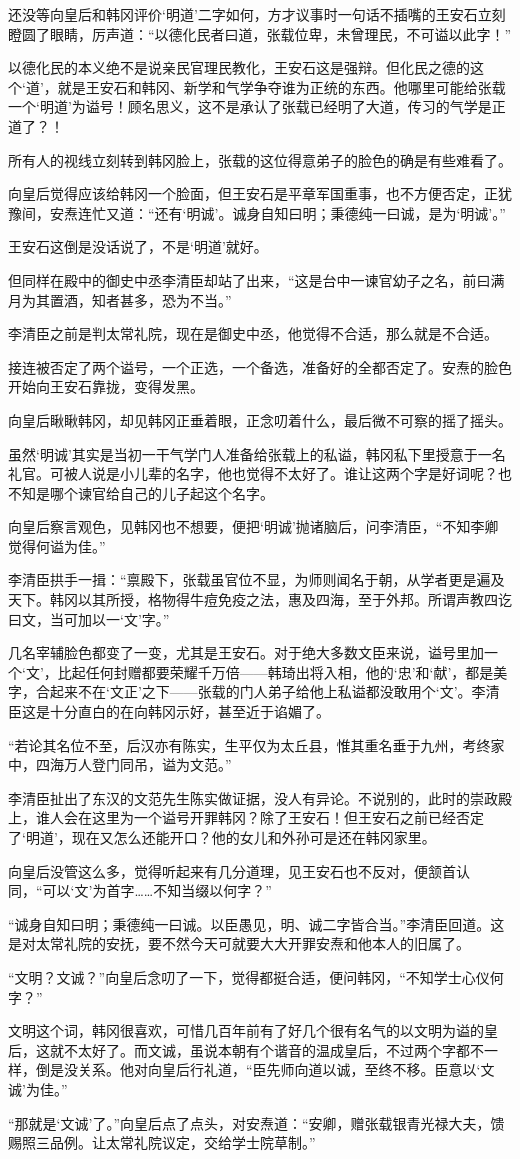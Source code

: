 还没等向皇后和韩冈评价‘明道’二字如何，方才议事时一句话不插嘴的王安石立刻瞪圆了眼睛，厉声道：“以德化民者曰道，张载位卑，未曾理民，不可谥以此字！”

以德化民的本义绝不是说亲民官理民教化，王安石这是强辩。但化民之德的这个‘道’，就是王安石和韩冈、新学和气学争夺谁为正统的东西。他哪里可能给张载一个‘明道’为谥号！顾名思义，这不是承认了张载已经明了大道，传习的气学是正道了？！

所有人的视线立刻转到韩冈脸上，张载的这位得意弟子的脸色的确是有些难看了。

向皇后觉得应该给韩冈一个脸面，但王安石是平章军国重事，也不方便否定，正犹豫间，安焘连忙又道：“还有‘明诚’。诚身自知曰明；秉德纯一曰诚，是为‘明诚’。”

王安石这倒是没话说了，不是‘明道’就好。

但同样在殿中的御史中丞李清臣却站了出来，“这是台中一谏官幼子之名，前曰满月为其置酒，知者甚多，恐为不当。”

李清臣之前是判太常礼院，现在是御史中丞，他觉得不合适，那么就是不合适。

接连被否定了两个谥号，一个正选，一个备选，准备好的全都否定了。安焘的脸色开始向王安石靠拢，变得发黑。

向皇后瞅瞅韩冈，却见韩冈正垂着眼，正念叨着什么，最后微不可察的摇了摇头。

虽然‘明诚’其实是当初一干气学门人准备给张载上的私谥，韩冈私下里授意于一名礼官。可被人说是小儿辈的名字，他也觉得不太好了。谁让这两个字是好词呢？也不知是哪个谏官给自己的儿子起这个名字。

向皇后察言观色，见韩冈也不想要，便把‘明诚’抛诸脑后，问李清臣，“不知李卿觉得何谥为佳。”

李清臣拱手一揖：“禀殿下，张载虽官位不显，为师则闻名于朝，从学者更是遍及天下。韩冈以其所授，格物得牛痘免疫之法，惠及四海，至于外邦。所谓声教四讫曰文，当可加以一‘文’字。”

几名宰辅脸色都变了一变，尤其是王安石。对于绝大多数文臣来说，谥号里加一个‘文’，比起任何封赠都要荣耀千万倍——韩琦出将入相，他的‘忠’和‘献’，都是美字，合起来不在‘文正’之下——张载的门人弟子给他上私谥都没敢用个‘文’。李清臣这是十分直白的在向韩冈示好，甚至近于谄媚了。

“若论其名位不至，后汉亦有陈实，生平仅为太丘县，惟其重名垂于九州，考终家中，四海万人登门同吊，谥为文范。”

李清臣扯出了东汉的文范先生陈实做证据，没人有异论。不说别的，此时的崇政殿上，谁人会在这里为一个谥号开罪韩冈？除了王安石！但王安石之前已经否定了‘明道’，现在又怎么还能开口？他的女儿和外孙可是还在韩冈家里。

向皇后没管这么多，觉得听起来有几分道理，见王安石也不反对，便颔首认同，“可以‘文’为首字……不知当缀以何字？”

“诚身自知曰明；秉德纯一曰诚。以臣愚见，明、诚二字皆合当。”李清臣回道。这是对太常礼院的安抚，要不然今天可就要大大开罪安焘和他本人的旧属了。

“文明？文诚？”向皇后念叨了一下，觉得都挺合适，便问韩冈，“不知学士心仪何字？”

文明这个词，韩冈很喜欢，可惜几百年前有了好几个很有名气的以文明为谥的皇后，这就不太好了。而文诚，虽说本朝有个谐音的温成皇后，不过两个字都不一样，倒是没关系。他对向皇后行礼道，“臣先师向道以诚，至终不移。臣意以‘文诚’为佳。”

“那就是‘文诚’了。”向皇后点了点头，对安焘道：“安卿，赠张载银青光禄大夫，馈赐照三品例。让太常礼院议定，交给学士院草制。”

